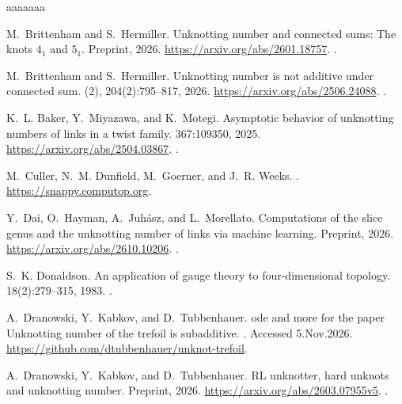 \documentclass[a4paper,11pt]{amsart}
\numberwithin{equation}{subsection}
\theoremstyle{plain}
\theoremstyle{remark}
\begin{document}
\begin{thebibliography}{aaaaaaa}

M.~Brittenham and S.~Hermiller.
\newblock Unknotting number and connected sums: The knots {$4_1$} and {$5_1$}.
\newblock Preprint, 2026.
\newblock \url{https://arxiv.org/abs/2601.18757}.
\newblock \href{https://doi.org/10.48550/arXiv.2601.18757}{}.

M.~Brittenham and S.~Hermiller.
\newblock Unknotting number is not additive under connected sum.
 (2), 204(2):795--817, 2026.
\newblock \url{https://arxiv.org/abs/2506.24088}.
\newblock \href{https://doi.org/10.4007/annals.2026.204.2.7}{}.

K.~L. Baker, Y.~Miyazawa, and K.~Motegi.
\newblock Asymptotic behavior of unknotting numbers of links in a twist family.
 367:109350, 2025.
\newblock \url{https://arxiv.org/abs/2504.03867}.
\newblock \href{https://doi.org/10.1016/j.topol.2025.109350}{}.

M.~Culler, N.~M. Dunfield, M.~Goerner, and J.~R. Weeks.
.
\newblock \url{https://snappy.computop.org}.

Y.~Dai, O.~Hayman, A.~Juh\'asz, and L.~Morellato.
\newblock Computations of the slice genus and the unknotting number of links via machine learning.
\newblock Preprint, 2026.
\newblock \url{https://arxiv.org/abs/2610.10206}.
\newblock \href{https://doi.org/10.48550/arXiv.2610.10206}{}.

S.~K. Donaldson.
\newblock An application of gauge theory to four-dimensional topology.
 18(2):279--315, 1983.
\newblock \href{https://doi.org/10.4310/jdg/1214437665}{}.

A.~Dranowski, Y.~Kabkov, and D.~Tubbenhauer.
ode and more for the paper {U}nknotting number of the trefoil is subadditive.
. Accessed 5.Nov.2026.
\newblock \url{https://github.com/dtubbenhauer/unknot-trefoil}.

A.~Dranowski, Y.~Kabkov, and D.~Tubbenhauer.
\newblock RL unknotter, hard unknots and unknotting number.
\newblock Preprint, 2026.
\newblock \url{https://arxiv.org/abs/2603.07955v5}.
\newblock \href{https://doi.org/10.48550/arXiv.2603.07955}{}.


\end{thebibliography}
\end{document}
